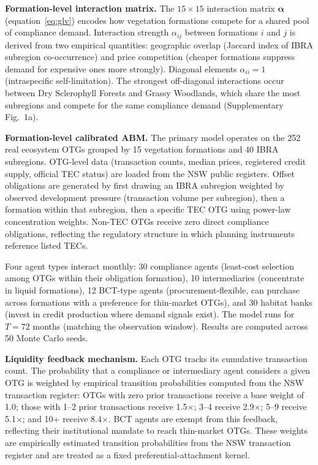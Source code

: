 \documentclass[pdflatex,sn-nature,oneside]{sn-jnl}
\begin{document}
\textbf{Formation-level interaction matrix.}
The $15 \times 15$ interaction matrix $\boldsymbol{\alpha}$ (equation~\ref{eq:glv})
encodes how vegetation formations compete for a shared pool of compliance demand.
Interaction strength $\alpha_{ij}$ between formations $i$ and $j$ is derived from
two empirical quantities: geographic overlap (Jaccard index of IBRA subregion
co-occurrence) and price competition (cheaper formations suppress demand for
expensive ones more strongly).
Diagonal elements $\alpha_{ii} = 1$ (intraspecific self-limitation).
The strongest off-diagonal interactions occur between Dry Sclerophyll Forests
and Grassy Woodlands, which share the most subregions and compete for the same
compliance demand (Supplementary Fig.~1a).

\textbf{Formation-level calibrated ABM.}
The primary model operates on the 252 real ecosystem OTGs grouped by 15 vegetation
formations and 40 IBRA subregions.
OTG-level data (transaction counts, median prices, registered credit supply,
official TEC status) are loaded from the NSW public registers.
Offset obligations are generated by first drawing an IBRA subregion weighted by
observed development pressure (transaction volume per subregion), then a formation
within that subregion, then a specific TEC OTG using power-law concentration
weights.
Non-TEC OTGs receive zero direct compliance obligations, reflecting the regulatory
structure in which planning instruments reference listed TECs.

Four agent types interact monthly: 30 compliance agents (least-cost selection among
OTGs within their obligation formation), 10 intermediaries (concentrate in liquid
formations), 12 BCT-type agents (procurement-flexible, can purchase across
formations with a preference for thin-market OTGs), and 30 habitat banks (invest
in credit production where demand signals exist).
The model runs for $T = 72$ months (matching the observation window).
Results are computed across 50 Monte Carlo seeds.

\textbf{Liquidity feedback mechanism.}
Each OTG tracks its cumulative transaction count.
The probability that a compliance or intermediary agent considers a given OTG is
weighted by empirical transition probabilities computed from the NSW transaction
register: OTGs with zero prior transactions receive a base weight of 1.0; those
with 1--2 prior transactions receive 1.5$\times$; 3--4 receive 2.9$\times$;
5--9 receive 5.1$\times$; and 10+ receive 8.4$\times$.
BCT agents are exempt from this feedback, reflecting their institutional mandate
to reach thin-market OTGs.
These weights are empirically estimated transition probabilities from
the NSW transaction register and are treated as a fixed
preferential-attachment kernel.
\end{document}
